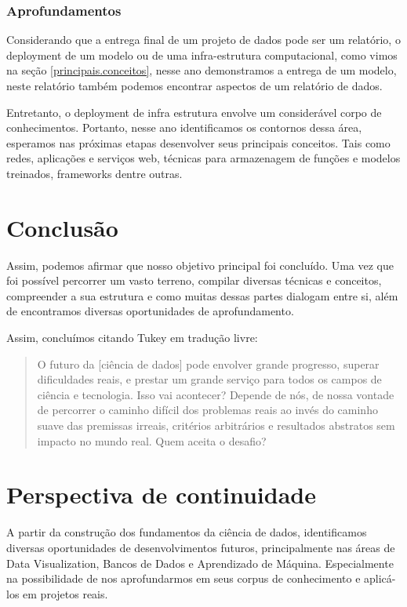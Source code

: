 \documentclass{article}
\begin{document}
\subsubsection{Aprofundamentos}
Considerando que a entrega final de um projeto de dados pode ser um relatório, o deployment de um modelo ou de uma infra-estrutura computacional, como vimos na seção \ref{principais.conceitos}, nesse ano demonstramos a entrega de um modelo, neste relatório também podemos encontrar aspectos de um relatório de dados.

Entretanto, o deployment de infra estrutura envolve um considerável corpo de conhecimentos. Portanto, nesse ano identificamos os contornos dessa área, esperamos nas próximas etapas desenvolver seus principais conceitos. Tais como redes, aplicações e serviços web, técnicas para armazenagem de funções e modelos treinados, frameworks dentre outras. 

\section{Conclusão}
Assim, podemos afirmar que nosso objetivo principal foi concluído. Uma vez que foi possível percorrer um vasto terreno, compilar diversas técnicas e conceitos, compreender a sua estrutura e como muitas dessas partes dialogam entre si, além de encontramos diversas oportunidades de aprofundamento. 

Assim, concluímos citando Tukey \cite{FoDA} em tradução livre:
\begin{quote}
O futuro da [ciência de dados] pode envolver grande progresso, superar dificuldades reais, e prestar um grande serviço para todos os campos de ciência e tecnologia. Isso vai acontecer? Depende de nós, de nossa vontade de percorrer o caminho difícil dos problemas reais ao invés do caminho suave das premissas irreais, critérios arbitrários e resultados abstratos sem impacto no mundo real. Quem aceita o desafio?
\end{quote}

\section{Perspectiva de continuidade}
A partir da construção dos fundamentos da ciência de dados, identificamos diversas oportunidades de desenvolvimentos futuros, principalmente nas áreas de Data Visualization, Bancos de Dados e Aprendizado de Máquina. Especialmente na possibilidade de nos aprofundarmos em seus corpus de conhecimento e aplicá-los em projetos reais. 
\end{document}
